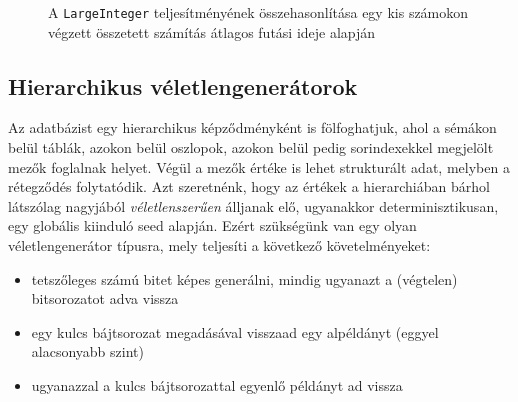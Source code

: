 \documentclass[
    parspace,
    noindent,
    nohyp,
]{elteiktdk}[2023/04/10]
\begin{document}
\begin{figure}[H]
    \centering
    \caption[A \texttt{LargeInteger} teljesítményének összevetése]{
        A \texttt{LargeInteger} teljesítményének összehasonlítása
        egy kis számokon végzett összetett számítás átlagos futási ideje alapján
    }
\end{figure}


\subsection{Hierarchikus véletlengenerátorok}

Az adatbázist egy hierarchikus képződményként is fölfoghatjuk,
ahol a sémákon belül táblák, azokon belül oszlopok,
azokon belül pedig sorindexekkel megjelölt mezők foglalnak helyet.
Végül a mezők értéke is lehet strukturált adat, melyben a rétegződés folytatódik.
Azt szeretnénk, hogy az értékek a hierarchiában bárhol
látszólag nagyjából \textit{véletlenszerűen} álljanak elő,
ugyanakkor determinisztikusan, egy globális kiinduló seed alapján.
Ezért szükségünk van egy olyan véletlengenerátor típusra,
mely teljesíti a következő követelményeket:

\begin{itemize}
    \item tetszőleges számú bitet képes generálni, mindig ugyanazt a (végtelen) bitsorozatot adva vissza
   \item egy kulcs bájtsorozat megadásával visszaad egy alpéldányt (eggyel alacsonyabb szint)
   \item ugyanazzal a kulcs bájtsorozattal egyenlő példányt ad vissza
\end{itemize}
\end{document}
